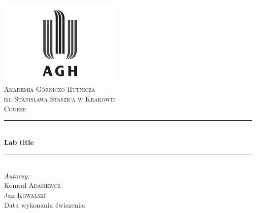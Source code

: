 \begin{titlepage}

\newcommand{\HRule}{\rule{\linewidth}{0.5mm}}

\center
 

\includegraphics[width=6cm]{../res/img/logo.png}\\[1cm]
 
 

\textsc{\LARGE Akademia Górniczo-Hutnicza \\[0.2cm]
im. Stanisława Staszica w Krakowie}\\[1.5cm]

\textsc{\Large Course}\\[0.5cm]


\HRule \\[0.5cm]
{ \huge \bfseries Lab title}\\[0.3cm]
\HRule \\[1.5cm]

\flushright
\Large \emph{Autorzy:}\\
Konrad \textsc{Adasiewcz}\\[0.1cm]  %
Jan \textsc{Kowalski}\\[3cm]        %

Data wykonania ćwiczenia: \\
{\large {}}\\[1cm]


\vfill %

\end{titlepage}